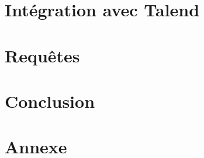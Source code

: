 \documentclass[a4paper,sffamily,12pt]{article}
\begin{document}
		\vspace{0.5cm}
				
	\section{Intégration avec Talend}

		\vspace{0.5cm}
		
		
		
		
		
		
			
	\section{Requêtes}

		\vspace{0.5cm}
		
		
		
		
		
																
	\section{Conclusion}

		\vspace{0.5cm}
		
		
		
		
				

		\newpage
	
	\section{Annexe}
					
\end{document}
